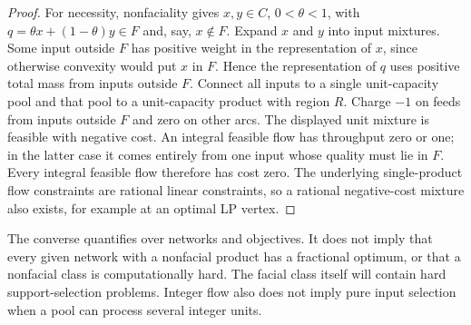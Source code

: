 \begin{proof}
For necessity, nonfaciality gives $x,y\in C$, $0<\theta<1$, with
$q=\theta x+(1-\theta)y\in F$ and, say, $x\notin F$. Expand $x$ and
$y$ into input mixtures. Some input outside $F$ has positive weight
in the representation of $x$, since otherwise convexity would put $x$
in $F$. Hence the representation of $q$ uses positive total mass from
inputs outside $F$. Connect all inputs to a single unit-capacity pool
and that pool to a unit-capacity product with region $R$. Charge $-1$
on feeds from inputs outside $F$ and zero on other arcs. The displayed
unit mixture is feasible with negative cost. An integral feasible flow
has throughput zero or one; in the latter case it comes entirely from
one input whose quality must lie in $F$. Every integral feasible flow
therefore has cost zero. The underlying single-product flow constraints
are rational linear constraints, so a rational negative-cost mixture
also exists, for example at an optimal LP vertex.
\end{proof}

The converse quantifies over networks and objectives. It does not imply
that every given network with a nonfacial product has a fractional
optimum, or that a nonfacial class is computationally hard. The facial
class itself will contain hard support-selection problems. Integer flow
also does not imply pure input selection when a pool can process several
integer units.

